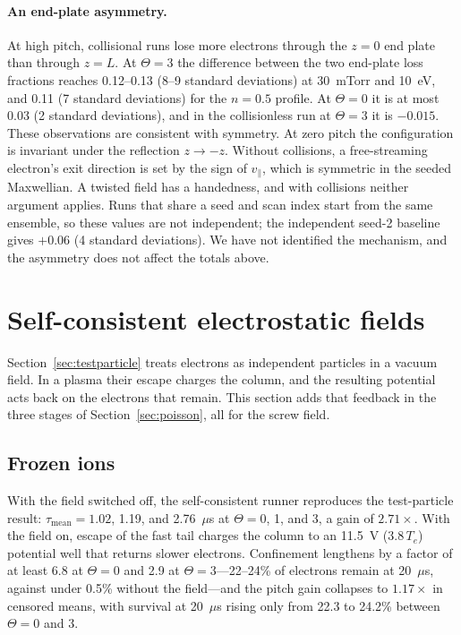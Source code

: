 \documentclass[11pt]{article}
\newcommand{\us}{\ensuremath{\mu}s}
\begin{document}
\paragraph{An end-plate asymmetry.} At high pitch, collisional runs lose more electrons through the $z = 0$ end plate than through $z = L$. At $\Theta = 3$ the difference between the two end-plate loss fractions reaches 0.12--0.13 (8--9 standard deviations) at 30~mTorr and 10~eV, and 0.11 (7 standard deviations) for the $n = 0.5$ profile. At $\Theta = 0$ it is at most 0.03 (2 standard deviations), and in the collisionless run at $\Theta = 3$ it is $-0.015$. These observations are consistent with symmetry. At zero pitch the configuration is invariant under the reflection $z \to -z$. Without collisions, a free-streaming electron's exit direction is set by the sign of $v_\parallel$, which is symmetric in the seeded Maxwellian. A twisted field has a handedness, and with collisions neither argument applies. Runs that share a seed and scan index start from the same ensemble, so these values are not independent; the independent seed-2 baseline gives $+0.06$ (4 standard deviations). We have not identified the mechanism, and the asymmetry does not affect the totals above.

\section{Self-consistent electrostatic fields}
\label{sec:selfconsistent}

Section~\ref{sec:testparticle} treats electrons as independent particles in a vacuum field. In a plasma their escape charges the column, and the resulting potential acts back on the electrons that remain. This section adds that feedback in the three stages of Section~\ref{sec:poisson}, all for the screw field.

\subsection{Frozen ions}
\label{sec:frozen}

With the field switched off, the self-consistent runner reproduces the test-particle result: $\tau_{\mathrm{mean}} = 1.02$, 1.19, and 2.76~\us{} at $\Theta = 0$, 1, and 3, a gain of $2.71\times$. With the field on, escape of the fast tail charges the column to an 11.5~V ($3.8\,T_e$) potential well that returns slower electrons. Confinement lengthens by a factor of at least 6.8 at $\Theta = 0$ and 2.9 at $\Theta = 3$---22--24\% of electrons remain at 20~\us, against under 0.5\% without the field---and the pitch gain collapses to $1.17\times$ in censored means, with survival at 20~\us{} rising only from 22.3 to 24.2\% between $\Theta = 0$ and 3.
\end{document}
